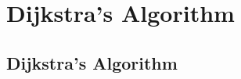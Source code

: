 \documentclass[../alevelmaths.tex]{subfiles}
\begin{document}
\chapter{Dijkstra's Algorithm}
\section{Dijkstra's Algorithm}
\end{document}
